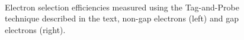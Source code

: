 \begin{figure}[!htb]
\begin{center}
    \\
\caption{Electron selection efficiencies measured using the Tag-and-Probe technique described in the text, non-gap electrons (left) and gap electrons (right).}
\label{fig:ele_sel_pt_turn_on}
\end{center}
\end{figure}


